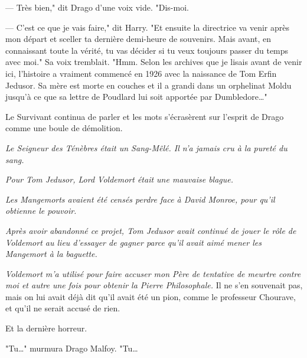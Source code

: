 --- Très bien," dit Drago d'une voix vide. "Dis-moi.

--- C'est ce que je vais faire," dit Harry. "Et ensuite la directrice va venir après mon départ et sceller ta dernière demi-heure de souvenirs. Mais avant, en connaissant toute la vérité, tu vas décider si tu veux toujours passer du temps avec moi." Sa voix tremblait. "Hmm. Selon les archives que je lisais avant de venir ici, l'histoire a vraiment commencé en 1926 avec la naissance de Tom Erfin Jedusor. Sa mère est morte en couches et il a grandi dans un orphelinat Moldu jusqu'à ce que sa lettre de Poudlard lui soit apportée par Dumbledore…"

Le Survivant continua de parler et les mots s'écrasèrent sur l'esprit de Drago comme une boule de démolition.

\emph{Le Seigneur des Ténèbres était un Sang-Mêlé. Il n'a jamais cru à la pureté du sang.}

\emph{Pour Tom Jedusor, Lord Voldemort était une mauvaise blague.}

\emph{Les Mangemorts avaient été censés perdre face à David Monroe, pour qu'il obtienne le pouvoir.}

\emph{Après avoir abandonné ce projet, Tom Jedusor avait continué de jouer le rôle de Voldemort au lieu d'essayer de gagner parce qu'il avait aimé mener les Mangemort à la baguette.}

\emph{Voldemort m'a utilisé pour faire accuser mon Père de tentative de meurtre contre moi et autre une fois pour obtenir la Pierre Philosophale.} Il ne s'en souvenait pas, mais on lui avait déjà dit qu'il avait été un pion, comme le professeur Chourave, et qu'il ne serait accusé de rien.

Et la dernière horreur.

"Tu…" murmura Drago Malfoy. "Tu…

